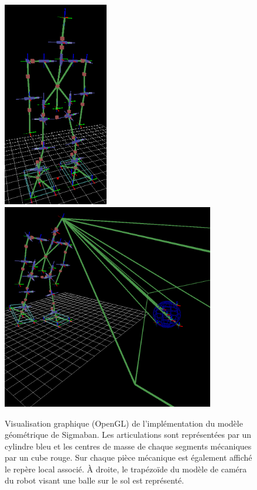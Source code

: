 \begin{figure}[htb]
    \centerfloat
    \includegraphics[height=9cm]{../media/model_gui1.png}
    \includegraphics[height=9cm]{../media/model_gui2.png}
    \caption{\label{fig:model_gui} 
        Visualisation graphique (OpenGL)
        de l'implémentation du modèle géométrique de Sigmaban.
        Les articulations sont représentées par un cylindre bleu
        et les centres de masse de chaque segments mécaniques
        par un cube rouge.
        Sur chaque pièce mécanique est également affiché le repère local associé.
        À droite, le trapézoïde du modèle de caméra du robot visant une balle 
        sur le sol est représenté.
    }
\end{figure}

